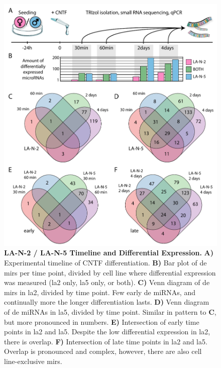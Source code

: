 \begin{figure} 
\includegraphics[width=\textwidth]{figures/timepoints-expr-venn}
\caption[Timeline Differential Expression.]{\textbf{LA-N-2 / LA-N-5 Timeline and Differential Expression.} \textbf{A)} Experimental timeline of CNTF differentiation. \textbf{B)} Bar plot of \acf{de} \acp{mir} per time point, divided by cell line where differential expression was measured (\ac{la2} only, \ac{la5} only, or both). \textbf{C)} Venn diagram of \ac{de} \acp{mir} in \ac{la2}, divided by time point. Few early \ac{de} miRNAs, and continually more the longer differentiation lasts. \textbf{D)} Venn diagram of \ac{de} miRNAs in \ac{la5}, divided by time point. Similar in pattern to \textbf{C}, but more pronounced in numbers. \textbf{E)} Intersection of early time points in \ac{la2} and \ac{la5}. Despite the low differential expression in \ac{la2}, there is overlap. \textbf{F)} Intersection of late time points in \ac{la2} and \ac{la5}. Overlap is pronounced and complex, however, there are also cell line-exclusive \acp{mir}.
\label{fig:timepoints-expr-venn}}
\end{figure}

